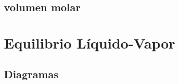 \documentclass[12pt,letterpaper ,oneside , openright]{book}
\begin{document}
      
	\tableofcontents	
 
			\subsection{volumen molar}\label{subsec:volume}
			  



		
			
		
		
		
		
		\section{Equilibrio Líquido-Vapor}\label{sec:heterogeneous}
		
		
		
		
		
		

		\subsection{Diagramas}
	



	
	
	
		
	
	
	\appendix
	
	
	
	
	

	
	  
\end{document}
